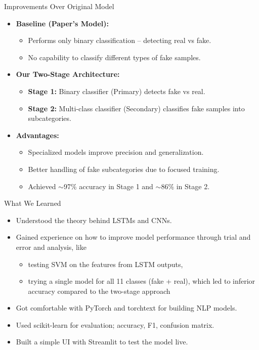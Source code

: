 \documentclass{beamer}
\begin{document}
\begin{frame}{Improvements Over Original Model}
    \begin{itemize}
        \item \textbf{Baseline (Paper's Model):}
        \begin{itemize}
            \item Performs only binary classification – detecting real vs fake.
            \item No capability to classify different types of fake samples.
        \end{itemize}

        \vspace{0.5em}
        \item \textbf{Our Two-Stage Architecture:}
        \begin{itemize}
            \item \textbf{Stage 1:} Binary classifier (Primary) detects fake vs real.
            \item \textbf{Stage 2:} Multi-class classifier (Secondary) classifies fake samples into subcategories.
        \end{itemize}

        \vspace{0.5em}
        \item \textbf{Advantages:}
        \begin{itemize}
            \item Specialized models improve precision and generalization.
            \item Better handling of fake subcategories due to focused training.
            \item Achieved $\sim$97\% accuracy in Stage 1 and $\sim$86\% in Stage 2.
        \end{itemize}
    \end{itemize}
\end{frame}

\begin{frame}{What We Learned}
    \begin{itemize}
        \item Understood the theory behind LSTMs and CNNs.
        \item Gained experience on how to improve model performance through trial
        and error and analysis, like
        \begin{itemize}
            \item testing SVM on the features from LSTM outputs,
            \item trying a single model for all 11 classes (fake + real), which led to inferior
            accuracy compared to the two-stage approach
        \end{itemize}
        \item Got comfortable with PyTorch and torchtext for building NLP models.
        \item Used scikit-learn for evaluation; accuracy, F1, confusion matrix.
        \item Built a simple UI with Streamlit to test the model live.
        
    \end{itemize}
\end{frame}
\end{document}
